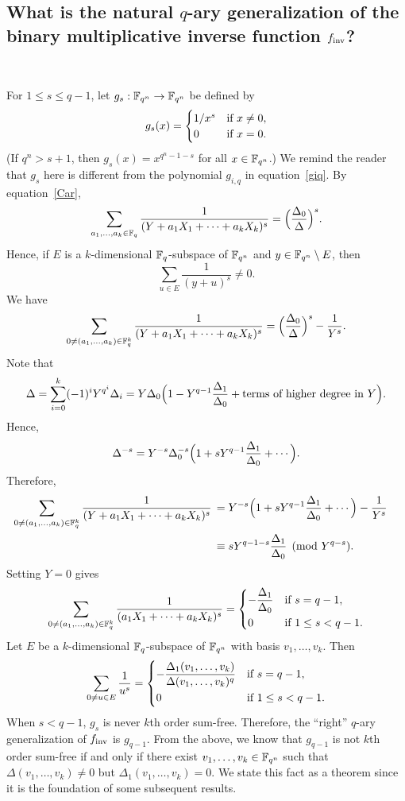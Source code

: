 \documentclass{amsart}
\numberwithin{equation}{section}
\theoremstyle{definition}
\newcommand{\f}{\Bbb F}
\newcommand{\fin}{f_{\text{\rm inv}}}
\begin{document}
\subsection{What is the natural $q$-ary generalization of the binary multiplicative inverse function $\fin$?}\

For $1\le s\le q-1$, let $g_s:\f_{q^n}\to\f_{q^n}$ be defined by 
\[
g_s(x)=\begin{cases}
1/x^s&\text{if}\ x\ne 0,\cr
0&\text{if}\ x=0.
\end{cases}
\]
(If $q^n>s+1$, then $g_s(x)=x^{q^n-1-s}$ for all $x\in\f_{q^n}$.) We remind the reader that $g_s$ here is different from the polynomial $g_{i,q}$ in equation~\eqref{giq}. By equation~\eqref{Car}, 
\begin{equation}\label{s-power-sum}
\sum_{a_1,\dots,a_k\in\f_q}\frac 1{(Y+a_1X_1+\cdots+a_kX_k)^s}=\Bigl(\frac{\Delta_0}\Delta\Bigr)^s.
\end{equation}
Hence, if $E$ is a $k$-dimensional $\f_q$-subspace of $\f_{q^n}$ and $y\in\f_{q^n}\setminus E$, then
\[
\sum_{u\in E}\frac 1{(y+u)^s}\ne 0.
\]
We have
\[
\sum_{0\ne(a_1,\dots,a_k)\in\f_q^k}\frac 1{(Y+a_1X_1+\cdots+a_kX_k)^s}=\Bigl(\frac{\Delta_0}\Delta\Bigr)^s-\frac 1{Y^s}.
\]
Note that 
\[
\Delta=\sum_{i=0}^k(-1)^iY^{q^i}\Delta_i=Y\Delta_0\Bigl(1-Y^{q-1}\frac{\Delta_1}{\Delta_0}+\text{terms of higher degree in $Y$}\Bigr).
\]
Hence,
\[
\Delta^{-s}=Y^{-s}\Delta_0^{-s}\Bigl(1+sY^{q-1}\frac{\Delta_1}{\Delta_0}+\cdots\Bigr).
\]
Therefore,
\begin{align*}
\sum_{0\ne(a_1,\dots,a_k)\in\f_q^k}\frac 1{(Y+a_1X_1+\cdots+a_kX_k)^s}
\,&= Y^{-s}\Bigl(1+sY^{q-1}\frac{\Delta_1}{\Delta_0}+\cdots\Bigr)-\frac 1{Y^s}\cr
&\equiv sY^{q-1-s}\frac{\Delta_1}{\Delta_0}\pmod{Y^{q-s}}.
\end{align*}
Setting $Y=0$ gives
\[
\sum_{0\ne(a_1,\dots,a_k)\in\f_q^k}\frac 1{(a_1X_1+\cdots+a_kX_k)^s}=
\begin{cases}
-\displaystyle\frac{\Delta_1}{\Delta_0}&\text{if}\ s=q-1,\vspace{0.2em}\cr
0&\text{if}\ 1\le s<q-1.
\end{cases}
\]
Let $E$ be a $k$-dimensional $\f_q$-subspace of $\f_{q^n}$ with basis $v_1,\dots,v_k$. Then
\[
\sum_{0\ne u\in E}\frac 1{u^s}=
\begin{cases}
-\displaystyle\frac{\Delta_1(v_1,\dots,v_k)}{\Delta(v_1,\dots,v_k)^q}&\text{if}\ s=q-1,\vspace{0.2em}\cr
0&\text{if}\ 1\le s<q-1.
\end{cases}
\]
When $s<q-1$, $g_s$ is never $k$th order sum-free. Therefore, the ``right'' $q$-ary generalization of $\fin$ is $g_{q-1}$. From the above, we know that $g_{q-1}$ is not $k$th order sum-free if and only if there exist $v_1,\dots,v_k\in\f_{q^n}$ such that $\Delta(v_1,\dots,v_k)\ne 0$ but $\Delta_1(v_1,\dots,v_k)=0$. 
We state this fact as a theorem since it is the foundation of some subsequent results.
\end{document}
